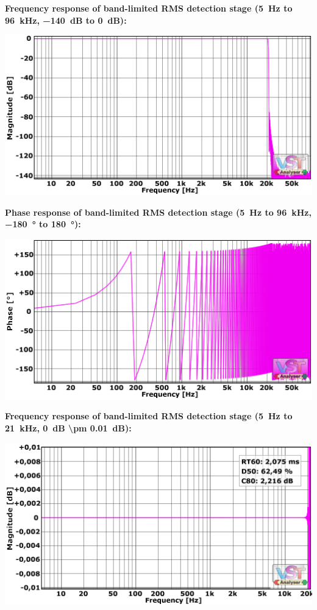 \newpage %

\textbf{Frequency response of band-limited RMS detection stage
  (\SI{5}{\hertz} to \SI{96}{\kilo\hertz}, \SI{-140}{\dB} to
  \SI{0}{\dB}):}

\begin{center}
  \includegraphics[scale=0.65,clip]{include/images/fft_192khz_freq-rms.png}
\end{center}

\textbf{Phase response of band-limited RMS detection stage
  (\SI{5}{\hertz} to \SI{96}{\kilo\hertz}, \SI{-180}{\degree} to
  \SI[addsign]{+180}{\degree}):}

\begin{center}
  \includegraphics[scale=0.65,clip]{include/images/fft_192khz_phase-rms.png}
\end{center}

\newpage %

\textbf{Frequency response of band-limited RMS detection stage
  (\SI{5}{\hertz} to \SI{21}{\kilo\hertz}, \SI{0}{\dB} \SI{\pm
    0.01}{\dB}):}

\begin{center}
  \includegraphics[scale=0.65,clip]{include/images/fft_192khz_freq-rms_zoomed.png}
\end{center}


